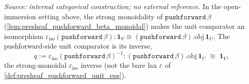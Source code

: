 \begin{definition}\leanok
  \label{def:presheaf_pushforward_unit_iso}
  \textit{Source: internal categorical construction; no external reference.}
  In the open-immersion setting above, the strong monoidality of \(\mathtt{pushforward}\,\beta\)
  (\cref{lem:presheaf_pushforward_beta_monoidal}) makes the unit comparator an isomorphism
  \(\varepsilon_{\mathrm{iso}}(\mathtt{pushforward}\,\beta) :
    \mathbf 1_V \cong (\mathtt{pushforward}\,\beta).\mathrm{obj}\,\mathbf 1_U\). The pushforward-side
  unit comparator is its inverse,
  \[
    q := \varepsilon_{\mathrm{iso}}(\mathtt{pushforward}\,\beta)^{-1} :
      (\mathtt{pushforward}\,\beta).\mathrm{obj}\,\mathbf 1_U \;\cong\; \mathbf 1_V ,
  \]
  the strong-monoidal \(\varepsilon_{\mathrm{iso}}\) inverse (not the bare lax \(\varepsilon\) of
  \cref{def:presheaf_pushforward_unit_eps}).
\end{definition}

